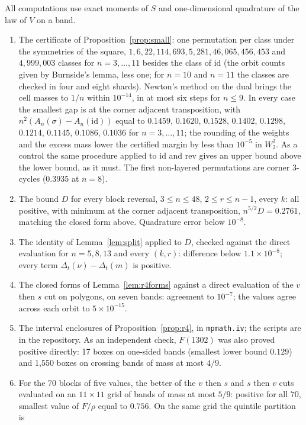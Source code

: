 \documentclass[11pt]{amsart}
\theoremstyle{definition}
\theoremstyle{remark}
\numberwithin{equation}{section}
\begin{document}
All computations use exact moments of $S$ and one-dimensional quadrature of the law of $V$ on a band.
\begin{enumerate}[leftmargin=*]
\item The certificate of Proposition~\ref{prop:small}: one permutation per class under the symmetries of the square,
$1,6,22,114,693,5{,}281,46{,}065,456{,}453$ and $4{,}999{,}003$ classes for $n=3,\dots,11$ besides the class of
$\mathrm{id}$ (the orbit counts given by Burnside's lemma, less one; for $n=10$ and $n=11$ the classes are checked in
four and eight shards). Newton's method
on the dual brings the cell masses to $1/n$ within $10^{-14}$, in at most six steps for $n\le9$. In every case the smallest gap is at the corner adjacent transposition, with
$n^2(A_n(\sigma)-A_n(\mathrm{id}))$ equal to $0.1459$, $0.1620$, $0.1528$, $0.1402$, $0.1298$, $0.1214$, $0.1145$, $0.1086$, $0.1036$ for
$n=3,\dots,11$; the rounding of the weights and the excess mass lower the certified margin by less than $10^{-5}$ in
$W_2^2$. As a control the
same procedure applied to $\mathrm{id}$ and $\mathrm{rev}$ gives an upper bound above the lower bound, as it must. The
first non-layered permutations are corner 3-cycles ($0.3935$ at $n=8$).
\item The bound $D$ for every block reversal, $3\le n\le48$, $2\le r\le n-1$, every $k$: all positive, with minimum at the
corner adjacent transposition, $n^{5/2}D=0.2761$, matching the closed form above. Quadrature error below $10^{-8}$.
\item The identity of Lemma~\ref{lem:split} applied to $D$, checked against the direct evaluation for $n=5,8,13$ and
every $(k,r)$: difference below $1.1\times10^{-8}$; every term $\Delta_t(\nu)-\Delta_t(m)$ is positive.
\item The closed forms of Lemma~\ref{lem:r4forms} against a direct evaluation of the $v$ then $s$ cut on polygons, on seven
bands: agreement to $10^{-7}$; the values agree across each orbit to $5\times10^{-15}$.
\item The interval enclosures of Proposition~\ref{prop:r4}, in \texttt{mpmath.iv}; the scripts are in the repository. As an
independent check, $F(1302)$ was also proved positive directly: 17 boxes on one-sided bands (smallest lower bound
$0.129$) and 1,550 boxes on crossing bands of mass at most $4/9$.
\item For the $70$ blocks of five values, the better of the $v$ then $s$ and $s$ then $v$ cuts evaluated on an $11\times11$ grid of bands of mass at most
$5/9$: positive for all $70$, smallest value of $F/\rho$ equal to $0.756$. On the same grid the quintile partition is

\end{enumerate}
\end{document}
